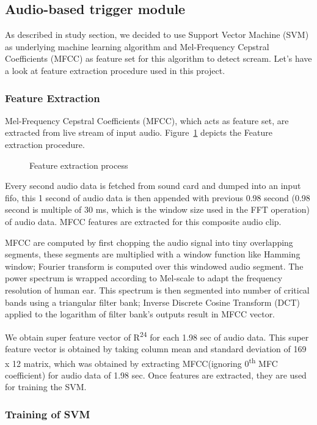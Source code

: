 \subsection{Audio-based trigger module}
As described in study section, we decided to use Support Vector Machine (SVM) as underlying machine learning algorithm and Mel-Frequency Cepstral Coefficients (MFCC) as feature set for this algorithm  to detect scream. Let's have a look at feature extraction procedure used in this project.
\subsubsection{Feature Extraction}
Mel-Frequency Cepstral Coefficients (MFCC), which acts as feature set, are extracted from live stream of input audio. Figure~\ref{fig:Featureextraction} depicts the Feature extraction procedure.

\begin{figure}[H]
\centering
\def\svgwidth{\textwidth}

\caption{Feature extraction process}
\label{fig:Featureextraction}
\end{figure}

Every second audio data is fetched from sound card and dumped into an input fifo, this 1 second of audio data is then appended with previous 0.98 second (0.98 second is multiple of 30 ms, which is the window size used in the FFT operation) of audio data. MFCC features are extracted for this composite audio clip.

MFCC are computed by first chopping the audio signal into tiny overlapping segments, these segments are multiplied with a window function like Hamming window; Fourier transform is computed over this windowed audio segment. The power spectrum is wrapped according to Mel-scale to adapt the frequency resolution of human ear. This spectrum is then segmented into number of critical bands using a triangular filter bank; Inverse Discrete Cosine Transform (DCT) applied to the logarithm of filter bank's outputs result in MFCC vector.

We obtain super feature vector of R\textsuperscript{24} for each 1.98 sec of audio data. This super feature vector is obtained by taking column mean and standard deviation of 169 x 12 matrix, which was obtained by extracting MFCC(ignoring 0\textsuperscript{th} MFC coefficient) for audio data of 1.98 sec. Once features are extracted, they are used for training the SVM.  

\subsubsection{Training of SVM}
